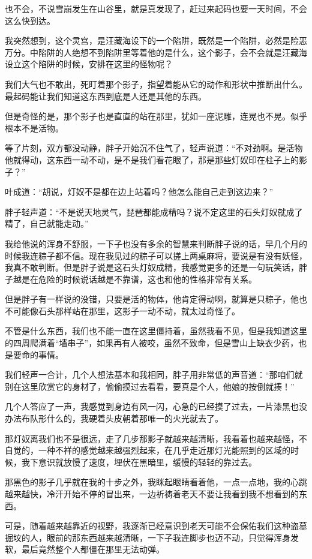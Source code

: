 也不会，不说雪崩发生在山谷里，就是真发现了，赶过来起码也要一天时间，不会这么快到达。

我突然想到，这个灵宫，是汪藏海设下的一个陷阱，既然是一个陷阱，必然是险恶万分。中陷阱的人绝想不到陷阱里等着他的是什么，这个影子，会不会就是汪藏海设立这个陷阱的时候，安排在这里的怪物呢？

我们大气也不敢出，死盯着那个影子，指望着能从它的动作和形状中推断出什么。最起码能让我们知道这东西到底是人还是其他的东西。

但是奇怪的是，那个影子也是直直的站在那里，犹如一座泥雕，连晃也不晃。似乎根本不是活物。

等了片刻，双方都没动静，胖子开始沉不住气了，轻声说道：“不对劲啊。是活物他就得动，这东西一动不动，是不是我们看花眼了，那是那些灯奴印在柱子上的影子？”

叶成道：“胡说，灯奴不是都在边上站着吗？他怎么能自己走到这边来？”

胖子轻声道：“不是说天地灵气，琵琶都能成精吗？说不定这里的石头灯奴就成了精了，自己就能走动。”

我给他说的浑身不舒服，一下子也没有多余的智慧来判断胖子说的话，早几个月的时候我连粽子都不信。现在我见过的粽子可以搓上两桌麻将，要说是有没有妖怪，我真不敢判断。但是胖子说是这石头灯奴成精，我感觉更多的还是一句玩笑话，胖子越是在危险的时候说话越是不靠谱，这也和他的性格非常有关系。

但是胖子有一样说的没错，只要是活的物体，他肯定得动啊，就算是只粽子，他也不可能像石头那样站在那里，这影子一动不动，就太过奇怪了。

不管是什么东西，我们也不能一直在这里僵持着，虽然我看不见，但是我知道这里的四周爬满着“墙串子”，如果再有人被咬，虽然不致命，但是雪山上缺衣少药，也是要命的事情。

我们轻声一合计，几个人想法基本和我相同，胖子用非常低的声音道：“那咱们就别在这里欣赏它的身材了，偷偷摸过去看看，要真是个人，他娘的按倒就揍！”

几个人答应了一声，我感觉到身边有风一闪，心急的已经摸了过去，一片漆黑也没办法布队形什么的，我硬着头皮朝着那唯一的火光就去了。

那灯奴离我们也不是很远，走了几步那影子就越来越清晰，我看着也越来越怪，不自觉的，一种不祥的感觉越来越强烈起来，在几乎走近那灯光能照到的区域的时候，我下意识就放慢了速度，埋伏在黑暗里，缓慢的轻轻的靠过去。

那黑色的影子几乎就在我的十步之外，我眯起眼睛看着他，一点一点地，我的心跳越来越快，冷汗开始不停的冒出来，一边祈祷着老天不要让我看到我不想看到的东西。

可是，随着越来越靠近的视野，我逐渐已经意识到老天可能不会保佑我们这种盗墓掘坟的人，眼前的那东西越来越清晰，一下子我连脚步也迈不动，只觉得浑身发软，最后竟然整个人都僵在那里无法动弹。

